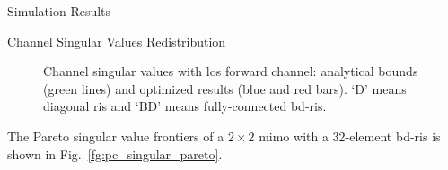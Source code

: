 \documentclass[journal]{IEEEtran}
\begin{document}
\begin{section}{Simulation Results}
\begin{subsection}{Channel Singular Values Redistribution}
		\begin{figure}[!t]
			\centering
			\caption{
				Channel singular values with \gls{los} forward channel: analytical bounds (green lines) and optimized results (blue and red bars).
				`D' means diagonal \gls{ris} and `BD' means fully-connected \gls{bd}-\gls{ris}.
			}
			\label{fg:pc_singular_bound}
		\end{figure}

		The Pareto singular value frontiers of a $2 \times 2$ \gls{mimo} with a 32-element \gls{bd}-\gls{ris} is shown in Fig.~\ref{fg:pc_singular_pareto}.
	\end{subsection}


\end{section}
\end{document}
